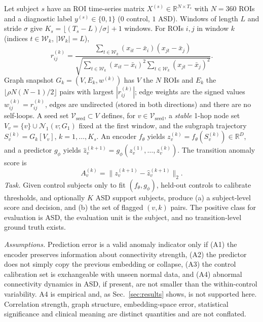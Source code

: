 \documentclass[conference]{IEEEtran}
\makeatletter
\renewcommand\section{\@startsection{section}{1}{\z@}{1.5ex plus 1.5ex minus 0.5ex}{0.7ex}{\normalfont\centering\bfseries}}
\makeatother
\begin{document}
\section{PROBLEM FORMULATION}
\label{sec:problem}
Let subject $s$ have an ROI time-series matrix $X^{(s)}\in\mathbb{R}^{N\times T_s}$ with $N{=}360$ ROIs and a diagnostic label $y^{(s)}\in\{0,1\}$ ($0$ control, $1$ ASD). Windows of length $L$ and stride $\sigma$ give $K_s=\lfloor (T_s-L)/\sigma\rfloor+1$ windows. For ROIs $i,j$ in window $k$ (indices $t\in\mathcal{W}_k$, $|\mathcal{W}_k|=L$),
\begin{equation}
r^{(k)}_{ij}=\frac{\sum_{t\in\mathcal{W}_k}(x_{it}-\bar{x}_i)(x_{jt}-\bar{x}_j)}{\sqrt{\sum_{t\in\mathcal{W}_k}(x_{it}-\bar{x}_i)^2\sum_{t\in\mathcal{W}_k}(x_{jt}-\bar{x}_j)^2}}.
\label{eq:pearson}
\end{equation}
Graph snapshot $G_k=(V,E_k,w^{(k)})$ has $V$ the $N$ ROIs and $E_k$ the $\lfloor\rho N(N{-}1)/2\rfloor$ pairs with largest $|r^{(k)}_{ij}|$; edge weights are the signed values $w^{(k)}_{ij}=r^{(k)}_{ij}$, edges are undirected (stored in both directions) and there are no self-loops. A seed set $\mathcal{V}_{\mathrm{seed}}\subset V$ defines, for $v\in\mathcal{V}_{\mathrm{seed}}$, a \emph{stable} 1-hop node set $V_v=\{v\}\cup\mathcal{N}_1(v;G_1)$ fixed at the first window, and the subgraph trajectory $S_v^{(k)}=G_k[V_v]$, $k=1,\dots,K_s$. An encoder $f_\theta$ yields $z^{(k)}_v=f_\theta(S^{(k)}_v)\in\mathbb{R}^{D}$, and a predictor $g_\phi$ yields $\hat z^{(k+1)}_v=g_\phi(z^{(1)}_v,\dots,z^{(k)}_v)$. The transition anomaly score is
\begin{equation}
A^{(k)}_v=\bigl\|z^{(k+1)}_v-\hat z^{(k+1)}_v\bigr\|_2 .
\label{eq:score}
\end{equation}
\emph{Task.} Given control subjects only to fit $(f_\theta,g_\phi)$, held-out controls to calibrate thresholds, and optionally $K$ ASD support subjects, produce (a) a subject-level score and decision, and (b) the set of flagged $(v,k)$ pairs. The positive class for evaluation is ASD, the evaluation unit is the subject, and no transition-level ground truth exists.

\emph{Assumptions.} Prediction error is a valid anomaly indicator only if (A1) the encoder preserves information about connectivity strength, (A2) the predictor does not simply copy the previous embedding or collapse, (A3) the control calibration set is exchangeable with unseen normal data, and (A4) abnormal connectivity dynamics in ASD, if present, are not smaller than the within-control variability. A4 is empirical and, as Sec.~\ref{sec:results} shows, is not supported here. Correlation strength, graph structure, embedding-space error, statistical significance and clinical meaning are distinct quantities and are not conflated.
\end{document}
